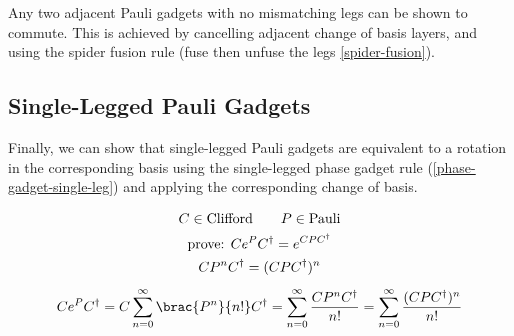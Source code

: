 Any two adjacent Pauli gadgets with no mismatching legs can be shown to commute. This is achieved by cancelling adjacent change of basis layers, and using the spider fusion rule (fuse then unfuse the legs \ref{spider-fusion}).



\subsection{Single-Legged Pauli Gadgets}%
\label{pauli-gadget-single-leg}

Finally, we can show that single-legged Pauli gadgets are equivalent to a rotation in the corresponding basis using the single-legged phase gadget rule (\ref{phase-gadget-single-leg}) and applying the corresponding change of basis.


\begin{equation*}
\begin{gathered}
    C \in \text{Clifford} \qquad P \in \text{Pauli} \\
    \text{prove: } Ce^PC^\dagger = e^{CPC^\dagger} \\
    CP^nC^\dagger  = (CPC^\dagger)^n \\[1ex]
    Ce^PC^\dagger = C \sum_{n=0}^\infty \brac{P^n}{n!} C^\dagger = \sum_{n=0}^\infty \frac{C P^n C^\dagger}{n!} = \sum_{n=0}^\infty \frac{(C P C^\dagger)^n}{n!}
\end{gathered}
\end{equation*}

